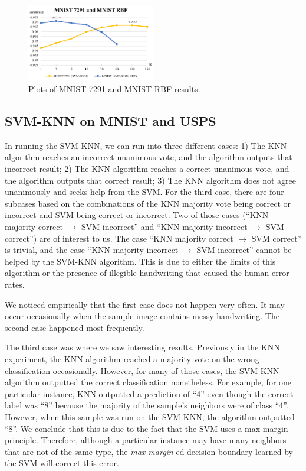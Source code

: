 \documentclass[11pt,letterpaper]{article}
\begin{document}
\begin{figure}[t!]
  \centering
  \includegraphics[keepaspectratio, width=0.5\textwidth]{mnist_rbf_7291.png}
  \caption{Plots of MNIST 7291 and MNIST RBF results.}
\end{figure}

\subsection{SVM-KNN on MNIST and USPS}

In running the SVM-KNN, we can run into three different cases: 1) The KNN algorithm reaches an incorrect unanimous vote, and the algorithm outputs that incorrect result; 2) The KNN algorithm reaches a correct unanimous vote, and the algorithm outputs that correct result; 3) The KNN algorithm does not agree unanimously and seeks help from the SVM. For the third case, there are four subcases based on the combinations of the KNN majority vote being correct or incorrect and SVM being correct or incorrect. Two of those cases (``KNN majority correct $\rightarrow$ SVM incorrect'' and ``KNN majority incorrect $\rightarrow$ SVM correct'') are of interest to us. The case ``KNN majority correct $\rightarrow$ SVM correct'' is trivial, and the case ``KNN majority incorrect $\rightarrow$ SVM incorrect'' cannot be helped by the SVM-KNN algorithm. This is due to either the limits of this algorithm or the presence of illegible handwriting that caused the human error rates.

We noticed empirically that the first case does not happen very often. It may occur occasionally when the sample image contains messy handwriting. The second case happened most frequently.

The third case was where we saw interesting results. Previously in the KNN experiment, the KNN algorithm reached a majority vote on the wrong classification occasionally. However, for many of those cases, the SVM-KNN algorithm outputted the correct classification nonetheless. For example, for one particular instance, KNN outputted a prediction of ``4'' even though the correct label was ``8'' because the majority of the sample's neighbors were of class ``4''. However, when this sample was run on the SVM-KNN, the algorithm outputted ``8''. We conclude that this is due to the fact that the SVM uses a max-margin principle. Therefore, although a particular instance may have many neighbors that are not of the same type, the \textit{max-margin}-ed decision boundary learned by the SVM will correct this error.
\end{document}
